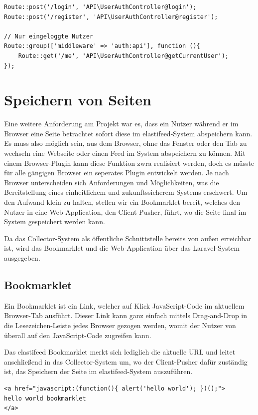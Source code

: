             \begin{lstlisting}
Route::post('/login', 'API\UserAuthController@login');
Route::post('/register', 'API\UserAuthController@register');

// Nur eingeloggte Nutzer
Route::group(['middleware' => 'auth:api'], function (){
    Route::get('/me', 'API\UserAuthController@getCurrentUser');
});
            \end{lstlisting}


\section{Speichern von Seiten}
    Eine weitere Anforderung am Projekt war es, dass ein Nutzer während er im Browser eine Seite betrachtet sofort diese im elastifeed-System abspeichern kann. Es muss also möglich sein, aus dem Browser, ohne das Fenster oder den Tab zu wechseln eine Webseite oder einen Feed im System abspeichern zu können. Mit einem Browser-Plugin kann diese Funktion zwra realisiert werden, doch es müsste für alle gängigen Browser ein seperates Plugin entwickelt werden. Je nach Browser unterscheiden sich Anforderungen und Möglichkeiten, was die Bereitstellung eines einheitlichem und zukunftssicherem Systems erschwert. Um den Aufwand klein zu halten, stellen wir ein Bookmarklet bereit, welches den Nutzer in eine Web-Application, den Client-Pusher, führt, wo die Seite final im System gespeichert werden kann.
    
    Da das Collector-System als öffentliche Schnittstelle bereits von außen erreichbar ist, wird das Bookmarklet und die Web-Application über das Laravel-System ausgegeben.
    
    \subsection{Bookmarklet}
        Ein Bookmarklet ist ein Link, welcher auf Klick JavaScript-Code im aktuellem Browser-Tab ausführt. Dieser Link kann ganz einfach mittels Drag-and-Drop in die Lesezeichen-Leiste jedes Browser gezogen werden, womit der Nutzer von überall auf den JavaScript-Code zugreifen kann.
        
        Das elastifeed Bookmarklet merkt sich lediglich die aktuelle URL und leitet anschließend in das Collector-System um, wo der Client-Pusher dafür zuständig ist, das Speichern der Seite im elastifeed-System auszuführen.
        
        \begin{lstlisting}[caption=HTML Aufbau eines Bookmarklet]
<a href="javascript:(function(){ alert('hello world'); })();">
hello world bookmarklet
</a>
        \end{lstlisting}

